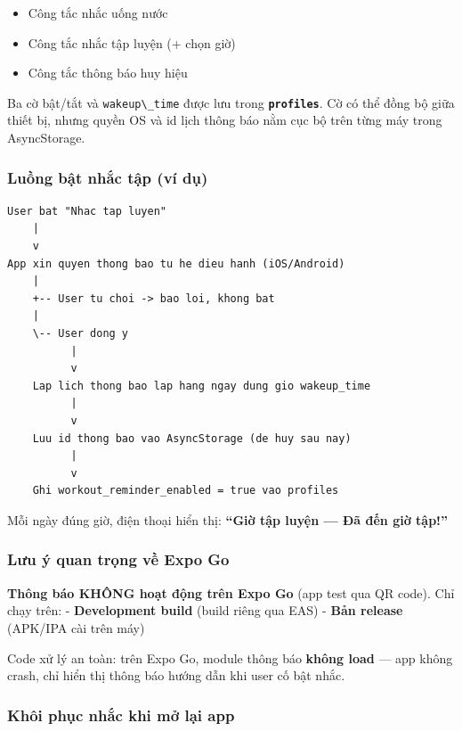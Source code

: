 \documentclass[12pt,a4paper]{article}
\providecommand{\passthrough}[1]{#1}
\providecommand{\tightlist}{%
  \setlength{\itemsep}{0pt}\setlength{\parskip}{0pt}}
\begin{document}
\begin{itemize}
\tightlist
\item
  Công tắc nhắc uống nước
\item
  Công tắc nhắc tập luyện (+ chọn giờ)
\item
  Công tắc thông báo huy hiệu
\end{itemize}

Ba cờ bật/tắt và \passthrough{\lstinline!wakeup\_time!} được lưu trong
\textbf{\passthrough{\lstinline!profiles!}}. Cờ có thể đồng bộ giữa
thiết bị, nhưng quyền OS và id lịch thông báo nằm cục bộ trên từng máy
trong AsyncStorage.

\subsubsection{Luồng bật nhắc tập (ví
dụ)}\label{luux1ed3ng-bux1eadt-nhux1eafc-tux1eadp-vuxed-dux1ee5}

\begin{lstlisting}
User bat "Nhac tap luyen"
    |
    v
App xin quyen thong bao tu he dieu hanh (iOS/Android)
    |
    +-- User tu choi -> bao loi, khong bat
    |
    \-- User dong y
          |
          v
    Lap lich thong bao lap hang ngay dung gio wakeup_time
          |
          v
    Luu id thong bao vao AsyncStorage (de huy sau nay)
          |
          v
    Ghi workout_reminder_enabled = true vao profiles
\end{lstlisting}

Mỗi ngày đúng giờ, điện thoại hiển thị: \textbf{``Giờ tập luyện --- Đã
đến giờ tập!''}

\subsubsection{Lưu ý quan trọng về Expo
Go}\label{lux1b0u-uxfd-quan-trux1ecdng-vux1ec1-expo-go}

\textbf{Thông báo KHÔNG hoạt động trên Expo Go} (app test qua QR code).
Chỉ chạy trên: - \textbf{Development build} (build riêng qua EAS) -
\textbf{Bản release} (APK/IPA cài trên máy)

Code xử lý an toàn: trên Expo Go, module thông báo \textbf{không load}
--- app không crash, chỉ hiển thị thông báo hướng dẫn khi user cố bật
nhắc.

\subsubsection{Khôi phục nhắc khi mở lại
app}\label{khuxf4i-phux1ee5c-nhux1eafc-khi-mux1edf-lux1ea1i-app}
\end{document}

